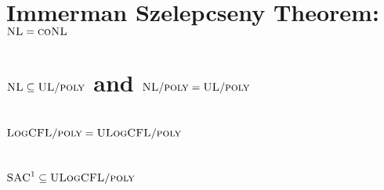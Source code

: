 \section{Immerman Szelepcseny Theorem: $\textsc{NL}=\textsc{coNL}$}

\section{$\textsc{NL}\subseteq \textsc{UL}\slash \textsc{poly}$ and $\textsc{NL}\slash\textsc{poly}=\textsc{UL}\slash\textsc{poly}$}

\section{$\textsc{LogCFL}\slash \textsc{poly}=\textsc{ULogCFL}\slash\textsc{poly}$}

\section{$\textsc{SAC}^1\subseteq \textsc{ULogCFL}\slash\textsc{poly}$}